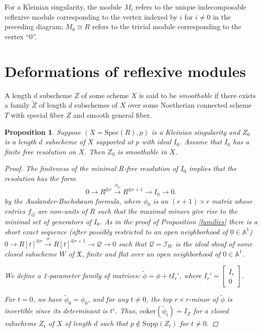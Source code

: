 \documentclass{amsart}[12pt]
\newtheorem{prop}[theorem]{Proposition}
\theoremstyle{definition}
\theoremstyle{remark}
\numberwithin{equation}{section}
\begin{document}
For a Kleinian singularity, the module $M_i$ refers to the unique indecomposable reflexive module corresponding to the vertex indexed by $i$ for $i \neq 0$ in the preceding diagram; $M_0 \cong R$ refers to the trivial module corresponding to the vertex ``0''.

\section{Deformations of reflexive modules}
A length $d$ subscheme $Z$ of some scheme $X$ is said to be \textit{smoothable} if there exists a family $\tilde{Z}$ of length $d$ subschemes of $X$ over some Noetherian connected scheme $T$ with special fiber $Z$ and smooth general fiber.

\begin{prop}\label{finitehd}
Suppose $(X = \mathrm{Spec}(R), p)$ is a Kleinian singularity and $Z_0$ is a length $d$ subscheme of $X$ supported at $p$ with ideal $I_0$. Assume that $I_0$ has a finite free resolution on $X$. Then $Z_0$ is smoothable in $X$. 
\begin{proof}
The finiteness of the minimal $R$-free resolution of $I_0$ implies that the resolution has the form
\begin{equation}\label{fhd}
0  \to R^{\oplus r} \xrightarrow{\phi_0} R^{\oplus r + 1} \to I_0 \to 0.
\end{equation}
by the Auslander-Buchsbaum formula, where $\phi_0$ is an $(r + 1) \times r$ matrix whose entries $f_{ij}$ are non-units of $R$ such that the maximal minors give rise to the minimal set of generators of $I_0$. As in the proof of Proposition \ref{families} there is a short exact sequence (after possibly restricted to an open neighborhood of $0 \in \mathbb{A}^1$) $0  \to R[t]^{\oplus r} \xrightarrow{\phi} R[t]^{\oplus r + 1} \to \mathcal{Q} \to 0$ such that $\mathcal{Q} = \mathcal{I}_W$ is the ideal sheaf of some closed subscheme $W$ of $\mathfrak{X}$, finite and flat over an open neighborhood of $0 \in \mathbb{A}^1$.

We define a 1-parameter family of matrices: $\tilde{\phi} = \phi + tI_{r}'$, where $I_{r}' = \begin{bmatrix}
I_{r} \\
0
\end{bmatrix}$.

For $t = 0$, we have $\tilde{\phi}_0 = \phi_0$, and for any $t \neq 0$, the top $r \times r$-minor of $\tilde{\phi}$ is invertible since its determinant is $t^{r}$. Thus, $\mathrm{coker} (\tilde{\phi}_t) = I_Z$ for a closed subscheme $Z_t$ of $X$ of length $d$ such that $p \not\in \mathrm{Supp}(Z_t)$ for $t \neq 0$. 
\end{proof}
\end{prop}
\end{document}
